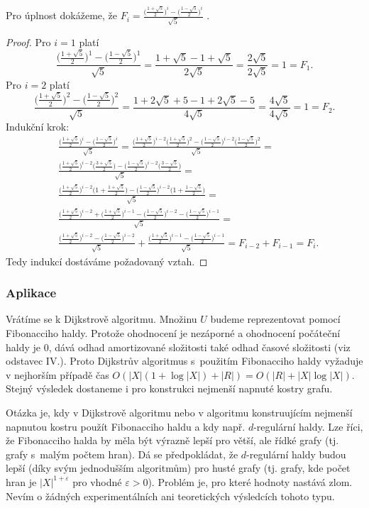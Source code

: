 \documentclass[a4paper,12pt]{article}
\begin{document}
Pro úplnost dokážeme, že $F_i=\frac {\big(\frac {
1+\sqrt 5}2\big)^i-\big(\frac {1-\sqrt 5}2\big)^i}{\sqrt 5}$ .
\begin{proof}
Pro $i=1$ platí 
$$\frac {\big(\frac {1+\sqrt 5}2\big)^1-\big(\frac {1-\sqrt 5}2\big
)^1}{\sqrt 5}=\frac {1+\sqrt 5-1+\sqrt 5}{2\sqrt 5}=\frac {2\sqrt 
5}{2\sqrt 5}=1=F_1.$$
Pro $i=2$ platí 
$$\frac {\big(\frac {1+\sqrt 5}2\big)^2-\big(\frac {1-\sqrt 5}2\big
)^2}{\sqrt 5}=\frac {1+2\sqrt 5+5-1+2\sqrt 5-5}{4\sqrt 5}=\frac {
4\sqrt 5}{4\sqrt 5}=1=F_2.$$
Indukční krok:
\begin{align*}&\frac {\big(\frac {1+\sqrt 5}2\big)^i-\big(\frac {1-\sqrt 
5}2\big)^i}{\sqrt 5}=\frac {\big(\frac {1+\sqrt 5}2\big)^{i-2}\big
(\frac {1+\sqrt 5}2\big)^2-\big(\frac {1-\sqrt 5}2\big)^{i-2}\big
(\frac {1-\sqrt 5}2\big)^2}{\sqrt 5}=\\
&\frac {\big(\frac {1+\sqrt 5}2\big)^{i-2}\big(\frac {3+\sqrt 5}2\big
)-\big(\frac {1-\sqrt 5}2\big)^{i-2}\big(\frac {3-\sqrt 5}2\big)}{\sqrt 
5}=\\
&\frac {\big(\frac {1+\sqrt 5}2\big)^{i-2}\big(1+\frac {1+\sqrt 5}
2\big)-\big(\frac {1-\sqrt 5}2\big)^{i-2}\big(1+\frac {1-\sqrt 5}
2\big)}{\sqrt 5}=\\
&\frac {\big(\frac {1+\sqrt 5}2\big)^{i-2}+\big(\frac {1+\sqrt 5}
2\big)^{i-1}-\big(\frac {1-\sqrt 5}2\big)^{i-2}-\big(\frac {1-\sqrt 
5}2\big)^{i-1}}{\sqrt 5}=\\
&\frac {\big(\frac {1+\sqrt 5}2\big)^{i-2}-\big(\frac {1-\sqrt 5}
2\big)^{i-2}}{\sqrt 5}+\frac {\big(\frac {1+\sqrt 5}2\big)^{i-1}-\big
(\frac {1-\sqrt 5}2\big)^{i-1}}{\sqrt 5}=F_{i-2}+F_{i-1}=F_i.\end{align*}
Tedy indukcí dostáváme požadovaný vztah.
\end{proof}

\subsubsection{Aplikace }

Vrátíme se k Dijkstrově algoritmu.  
Množinu $U$ bude\-me reprezentovat pomocí Fibonacciho haldy.  
Protože ohodnocení je nezáporné a ohodnocení počáteční haldy 
je $0$, dává odhad amortizované složitosti také odhad časové 
složitosti (viz odstavec IV.).  Proto Dijkstrův 
algoritmus s~použitím 
Fibonacciho haldy vyžaduje v nejhorším případě čas 
$O(|X|(1+\log|X|)+|R|)=O(|R|+|X|\log|X|)$.  Stejný výsledek 
dostane\-me i pro konstrukci nejmenší napnuté kostry grafu.  

Otázka je, kdy v Dijkstrově algoritmu nebo v 
algoritmu konstruují\-cím nejmenší napnutou kostru použít Fibonacciho haldu a kdy 
např.  $d$-regu\-lár\-ní haldy. Lze 
říci, že Fibonacciho halda by měla být výrazně lepší pro 
větší, ale řídké grafy (tj. grafy s~malým počtem hran). 
Dá se předpokládat, že $d$-regulární haldy budou lepší 
(díky svým jednodušším algoritmům) pro husté 
grafy (tj. grafy, kde počet hran je $|X|^{1+\varepsilon}$ pro vhodné 
$\varepsilon >0$). Problém je, pro které hodnoty nastává zlom. 
Nevím o žádných experimentálních ani teoretických 
výsledcích tohoto typu.
\end{document}
